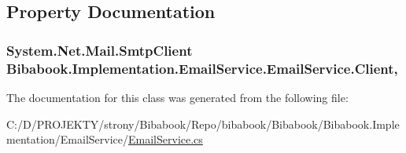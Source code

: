 \subsection{Property Documentation}
\hypertarget{class_bibabook_1_1_implementation_1_1_email_service_1_1_email_service_a8bcc8888961a94b44a79bedaa82fbe63}{}
\subsubsection[{Client}]{\setlength{\rightskip}{0pt plus 5cm}System.\+Net.\+Mail.\+Smtp\+Client Bibabook.\+Implementation.\+Email\+Service.\+Email\+Service.\+Client\hspace{0.3cm}{\ttfamily [get]}, {\ttfamily [set]}}\label{class_bibabook_1_1_implementation_1_1_email_service_1_1_email_service_a8bcc8888961a94b44a79bedaa82fbe63}


The documentation for this class was generated from the following file\+:\begin{DoxyCompactItemize}
\item 
C\+:/\+D/\+P\+R\+O\+J\+E\+K\+T\+Y/strony/\+Bibabook/\+Repo/bibabook/\+Bibabook/\+Bibabook.\+Implementation/\+Email\+Service/\hyperlink{_email_service_8cs}{Email\+Service.\+cs}\end{DoxyCompactItemize}
